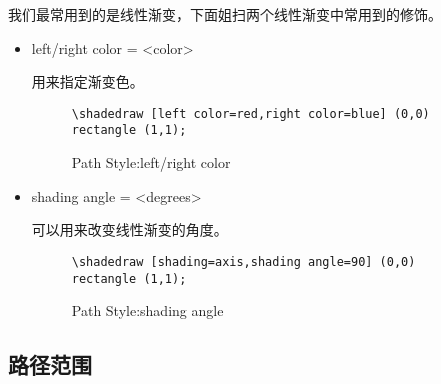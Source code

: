 我们最常用到的是线性渐变，下面姐扫两个线性渐变中常用到的修饰。

\begin{itemize}
    \item left/right color = <color>

    用来指定渐变色。
    \begin{figure}[H]
        \centering
        \begin{minipage}{0.35\linewidth}
            \centering
        \end{minipage}
        \begin{minipage}{0.55\linewidth}
            \begin{lstlisting}[style = latex-side]
    \shadedraw [left color=red,right color=blue] (0,0) rectangle (1,1);
            \end{lstlisting}
        \end{minipage}
        \caption{Path Style:left/right color}
    \end{figure}

    \item shading angle = <degrees>
    
    可以用来改变线性渐变的角度。
    \begin{figure}[H]
        \centering
        \begin{minipage}{0.35\linewidth}
            \centering
        \end{minipage}
        \begin{minipage}{0.55\linewidth}
            \begin{lstlisting}[style = latex-side]
                \shadedraw [shading=axis,shading angle=90] (0,0) rectangle (1,1);
            \end{lstlisting}
        \end{minipage}
        \caption{Path Style:shading angle}
    \end{figure}
\end{itemize}

\subsection{路径范围}
